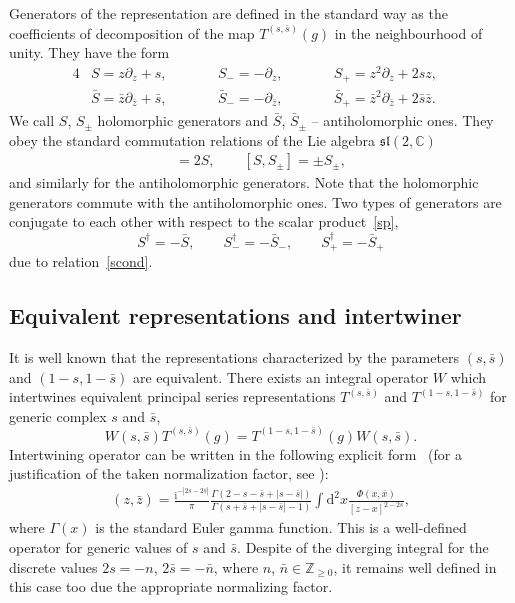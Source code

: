 \documentclass[pdftex]{sigma}
\renewcommand{\imath}{\mathrm{i}}
\numberwithin{equation}{section}
\begin{document}
Generators of the representation are defined in the standard way as the coefficients of decomposition of the map $T^{(s,\bar{s})}(g)$ in the neighbourhood of unity.
They have the form
\begin{alignat}{4}
		&S = z\partial_z + s, \qquad&& S_- = -\partial_z, \qquad&&
		S_+ = z^2\partial_z+2sz,& \nonumber\\
		&
		\bar{S} = \bar{z}\partial_{\bar{z}} + \bar{s}, \qquad&& \bar{S}_- = -\partial_{\bar{z}}, \qquad&&
		\bar{S}_+ = \bar{z}^2\partial_{\bar{z}}+2\bar{s}\bar{z} .&\label{gen}
\end{alignat}
We call $S$, $S_{\pm}$ holomorphic generators and $\bar{S}$, $\bar{S}_\pm$ -- antiholomorphic ones. They obey the standard commutation relations of the Lie algebra $\mathfrak{sl}(2,\mathbb{C})$
\begin{align*}
	[S_+, S_-] = 2S, \qquad [S,S_\pm] = \pm S_\pm,
\end{align*}
and similarly for the antiholomorphic generators. Note that the holomorphic generators commute with the antiholomorphic ones. Two types of generators are conjugate to each other with respect to the scalar product~\eqref{sp},
\begin{equation} \label{Shc}
	S^\dagger = -\bar{S}, \qquad S_-^\dagger = -\bar{S}_-, \qquad
	S_+^\dagger = -\bar{S}_+
\end{equation}
due to relation~\eqref{scond}.

\subsection{Equivalent representations and intertwiner}

It is well known \cite{GGV, GN} that the representations characterized by the
parameters $(s, \bar s)$ and $(1-s, 1-\bar{s})$ are equivalent.
There exists an integral operator $W$ which intertwines
equivalent principal series representations $T^{(s,\bar{s})}$
and $T^{(1-s,1-\bar{s})}$ for generic complex $s$ and $\bar{s}$,
\begin{equation*}
W(s,\bar{s}) T^{(s,\bar{s})}(g) =
T^{(1-s,1-\bar{s})}(g) W(s,\bar{s}) .
\end{equation*}
Intertwining operator can be written in the following explicit form~\cite{GGV}
(for a justification of the taken normalization factor,
see \cite{DM1}):
\begin{align*}
 [ W(s,\bar{s}) \Phi ](z,\bar{z}) =
\frac{\imath^{-|2s-2\bar s|}}{\pi}
 \frac{\Gamma (2-s-\bar s+|s-\bar s| )}
{\Gamma (s+\bar s+|s-\bar s| -1 )}
\int \mathrm{d}^2 x \frac{\Phi(x,\bar{x})}{[z-x]^{2-2s}},
\end{align*}
where $\Gamma(x)$ is the standard Euler gamma function.
This is a well-defined operator for generic values of $s$ and $\bar{s}$.
Despite of the diverging integral for the discrete values $2s = -n$,
$2\bar{s} = -\bar{n}$, where $n$, $\bar{n} \in \mathbb{Z}_{\geq 0}$,
it remains well defined in this case too due the appropriate
normalizing factor.
\end{document}

